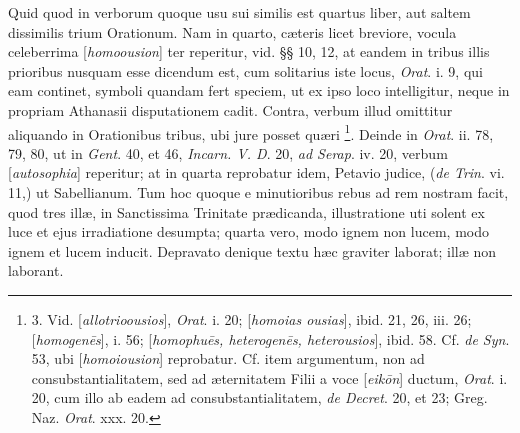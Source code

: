 Quid
quod in verborum quoque usu sui similis est quartus liber, aut saltem
dissimilis trium Orationum. Nam in quarto, cæteris licet breviore,
vocula celeberrima [\emph{homoousion}] ter reperitur, vid. §§ 10, 12,
at eandem in tribus illis prioribus nusquam esse dicendum est, cum
solitarius iste locus, \emph{Orat}. i. 9, qui eam continet, symboli
quandam fert speciem, ut ex ipso loco intelligitur, neque in propriam
Athanasii disputationem cadit. Contra, verbum illud omittitur
aliquando in Orationibus tribus, ubi jure posset quæri \footnote{3.
Vid. [\emph{allotrioousios}], \emph{Orat}. i. 20; [\emph{homoias ousias}], ibid. 21, 26,
iii. 26; [\emph{homogen\={e}s}], i. 56; [\emph{homophu\={e}s,
heterogen\={e}s, heterousios}],
ibid. 58. Cf. \emph{de Syn}. 53, ubi [\emph{homoiousion}] reprobatur. Cf. item
argumentum, non ad consubstantialitatem, sed ad æternitatem Filii a
voce [\emph{eik\={o}n}] ductum, \emph{Orat}. i. 20, cum illo ab eadem ad
consubstantialitatem, \emph{de Decret}. 20, et 23; Greg. Naz. \emph{Orat}. xxx. 20.}. Deinde in \emph{Orat}. ii. 78, 79, 80, ut in \emph{Gent}. 40,
et 46, \emph{Incarn. V. D}. 20, \emph{ad Serap}. iv. 20, verbum [\emph{autosophia}]
reperitur; at in quarta reprobatur idem, Petavio judice, (\emph{de Trin}.
vi. 11,) ut Sabellianum. Tum hoc quoque e minutioribus rebus ad rem
nostram facit, quod tres illæ, in Sanctissima Trinitate prædicanda,
illustratione uti solent ex luce et ejus irradiatione desumpta; quarta
vero, modo ignem non lucem, modo ignem et lucem inducit. Depravato
denique textu hæc graviter laborat; illæ non laborant.

